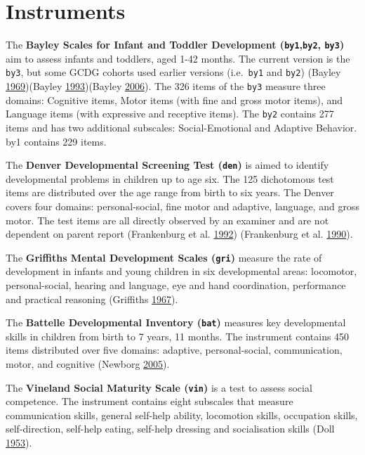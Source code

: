 \documentclass[
]{book}
\begin{document}
\hypertarget{sec:instruments}{%
\section{Instruments}\label{sec:instruments}}

The \textbf{Bayley Scales for Infant and Toddler Development (\texttt{by1},\texttt{by2}, \texttt{by3})} aim to assess infants and toddlers, aged 1-42 months. The current version is the \texttt{by3}, but some GCDG cohorts used earlier versions (i.e.~\texttt{by1} and \texttt{by2}) (Bayley \protect\hyperlink{ref-bayley1969}{1969})(Bayley \protect\hyperlink{ref-bayley1993}{1993})(Bayley \protect\hyperlink{ref-bayley2006}{2006}). The 326 items of the \texttt{by3} measure three domains: Cognitive items, Motor items (with fine and gross motor items), and Language items (with expressive and receptive items). The \texttt{by2} contains 277 items and has two additional subscales: Social-Emotional and Adaptive Behavior. by1 contains 229 items.

The \textbf{Denver Developmental Screening Test (\texttt{den})} is aimed to identify developmental problems in children up to age six. The 125 dichotomous test items are distributed over the age range from birth to six years. The Denver covers four domains: personal-social, fine motor and adaptive, language, and gross motor. The test items are all directly observed by an examiner and are not dependent on parent report (Frankenburg et al. \protect\hyperlink{ref-frankenburg1992}{1992}) (Frankenburg et al. \protect\hyperlink{ref-frankenburg1990}{1990}).

The \textbf{Griffiths Mental Development Scales (\texttt{gri})} measure the rate of development in infants and young children in six developmental areas: locomotor, personal-social, hearing and language, eye and hand coordination, performance and practical reasoning (Griffiths \protect\hyperlink{ref-griffiths1967}{1967}).

The \textbf{Battelle Developmental Inventory (\texttt{bat})} measures key developmental skills in children from birth to 7 years, 11 months. The instrument contains 450 items distributed over five domains: adaptive, personal-social, communication, motor, and cognitive (Newborg \protect\hyperlink{ref-newborg2005}{2005}).

The \textbf{Vineland Social Maturity Scale (\texttt{vin})} is a test to assess social competence. The instrument contains eight subscales that measure communication skills, general self-help ability, locomotion skills, occupation skills, self-direction, self-help eating, self-help dressing and socialisation skills (Doll \protect\hyperlink{ref-doll1953}{1953}).
\end{document}
